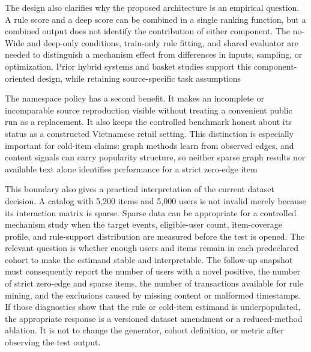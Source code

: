 \documentclass[10pt,a4paper]{article}
\begin{document}
The design also clarifies why the proposed architecture is an empirical
question. A rule score and a deep score can be combined in a single ranking
function, but a combined output does not identify the contribution of either
component. The no-Wide and deep-only conditions, train-only rule fitting, and
shared evaluator are needed to distinguish a mechanism effect from differences
in inputs, sampling, or optimization. Prior hybrid systems and basket studies
support this component-oriented design, while retaining source-specific task
assumptions \cite{peng2022_ham} %
\cite{peng2023_m2} %
\cite{li2023_repetition_exploration} %

The namespace policy has a second benefit. It makes an incomplete or
incomparable source reproduction visible without treating a convenient public
run as a replacement. It also keeps the controlled benchmark honest about its
status as a constructed Vietnamese retail setting. This distinction is
especially important for cold-item claims: graph methods learn from observed
edges, and content signals can carry popularity structure, so neither sparse
graph results nor available text alone identifies performance for a strict
zero-edge item \cite{he2020_lightgcn} %
\cite{meehan2025_cold_popbias} %

This boundary also gives a practical interpretation of the current dataset
decision. A catalog with 5,200 items and 5,000 users is not invalid merely
because its interaction matrix is sparse. Sparse data can be appropriate for a
controlled mechanism study when the target events, eligible-user count,
item-coverage profile, and rule-support distribution are measured before the
test is opened. The relevant question is whether enough users and items remain
in each predeclared cohort to make the estimand stable and interpretable. The
follow-up snapshot must consequently report the number of users with a novel
positive, the number of strict zero-edge and sparse items, the number of
transactions available for rule mining, and the exclusions caused by missing
content or malformed timestamps. If those diagnostics show that the rule or
cold-item estimand is underpopulated, the appropriate response is a versioned
dataset amendment or a reduced-method ablation. It is not to change the
generator, cohort definition, or metric after observing the test output.
\end{document}
